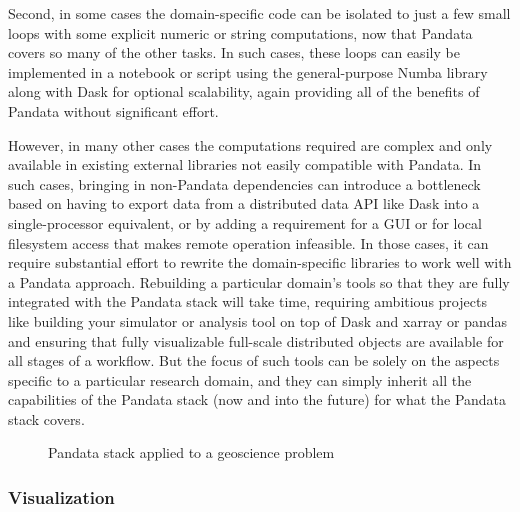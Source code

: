 Second, in some cases the domain-specific code can be isolated to just a few small loops with some explicit numeric or string computations, now that Pandata covers so many of the other tasks. In such cases, these loops can easily be implemented in a notebook or script using the general-purpose Numba library along with Dask for optional scalability, again providing all of the benefits of Pandata without significant effort.

However, in many other cases the computations required are complex and only available in existing external libraries not easily compatible with Pandata. In such cases, bringing in non-Pandata dependencies can introduce a bottleneck based on having to export data from a distributed data API like Dask into a single-processor equivalent, or by adding a requirement for a GUI or for local filesystem access that makes remote operation infeasible. In those cases, it can require substantial effort to rewrite the domain-specific libraries to work well with a Pandata approach. Rebuilding a particular domain's tools so that they are fully integrated with the Pandata stack will take time, requiring ambitious projects like building your simulator or analysis tool on top of Dask and xarray or pandas and ensuring that fully visualizable full-scale distributed objects are available for all stages of a workflow. But the focus of such tools can be solely on the aspects specific to a particular research domain, and they can simply inherit all the capabilities of the Pandata stack (now and into the future) for what the Pandata stack covers.

\begin{figure}[h]
    \noindent{}
    \caption{Pandata stack applied to a geoscience problem\label{pandata-geoscience}}
\end{figure}
\subsubsection{Visualization}

